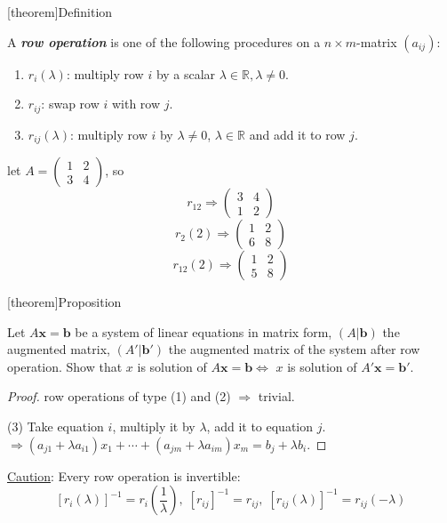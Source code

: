\documentclass[12pt]{report}
\theoremstyle{definition}
\begin{document}
[theorem]{Definition}
\begin{row operation}
    A \textbf{\emph{row operation}} is one of the following procedures on a $n \times m$-matrix $(a_{ij})$:
    \begin{enumerate}[label = (\arabic*)]
        \item $r_i(\lambda)$: multiply row $i$ by a scalar $\lambda \in \mathbb{R}, \lambda \neq 0$.
        \item $r_{ij}$: swap row $i$ with row $j$.
        \item $r_{ij}(\lambda)$: multiply row $i$ by $\lambda \neq 0$, $\lambda \in \mathbb{R}$ and add it to row $j$.
    \end{enumerate}
\end{row operation}

\begin{ex}
    let $A = \begin{pmatrix}
        1 & 2 \\
        3 & 4
    \end{pmatrix} $, so\[
        r_{12} \Rightarrow \begin{pmatrix}
            3 & 4 \\ 
            1 & 2
        \end{pmatrix} 
    \]\[
    r_2(2) \Rightarrow \begin{pmatrix}
        1 & 2\\
        6 & 8
    \end{pmatrix} 
    \]\[
    r_{12}(2) \Rightarrow \begin{pmatrix}
        1 & 2 \\
        5 & 8
    \end{pmatrix} 
    \]
\end{ex}

[theorem]{Proposition}
\begin{row operation on augmented matrix}
    Let $A\mathbf{x} = \mathbf{b}$ be a system of linear equations in matrix form, $(A|\mathbf{b})$
    the augmented matrix, $(A'|\mathbf{b}')$ the augmented matrix of the system after row operation.
    Show that $x$ is solution of $A\mathbf{x} = \mathbf{b} \iff$ $x$ is solution of $A'\mathbf{x} = \mathbf{b}'$.
\end{row operation on augmented matrix}

\begin{proof}
    row operations of type (1) and (2) $\Rightarrow$ trivial.%

    (3) Take equation $i$, multiply it by $\lambda$, add it to equation $j$.
    $\Rightarrow (a_{j1} + \lambda a_{i 1}) x_1 + \cdots + (a_{jm} + \lambda a_{im})x_m = b_j + \lambda b_i$.
\end{proof}
\underline{Caution}: Every row operation is invertible: \[
    {[r_i(\lambda)]}^{-1} = r_i(\frac{1}{\lambda}),\; {[r_{ij}]}^{-1} = r_{ij},\;
    {[r_{ij}(\lambda)]}^{-1} = r_{ij}(-\lambda)
\]
\end{document}
